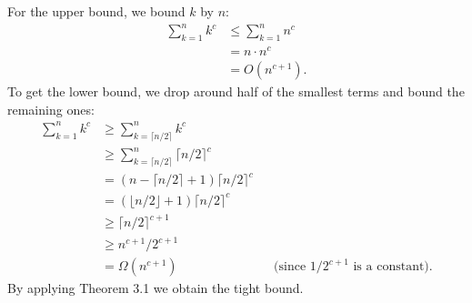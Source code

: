 \exercise
For the upper bound, we bound $k$ by $n$:
\begin{align*}
    \sum_{k=1}^n k^c &\le \sum_{k=1}^n n^c \\
    &= n\cdot n^c \\
    &= O(n^{c+1}).
\end{align*}
To get the lower bound, we drop around half of the smallest terms and bound the remaining ones:
\begin{align*}
    \sum_{k=1}^n k^c &\ge \sum_{k=\lceil n/2\rceil}^{n} k^c \\
    &\ge \sum_{k=\lceil n/2\rceil}^{n} \lceil n/2\rceil^c \\
    &= (n-\lceil n/2\rceil+1)\lceil n/2\rceil^c \\
    &= (\lfloor n/2\rfloor+1)\lceil n/2\rceil^c \\
    &\ge \lceil n/2\rceil^{c+1} \\
    &\ge n^{c+1}\!/2^{c+1} \\
    &= \Omega(n^{c+1}) && \text{(since $1/2^{c+1}$ is a constant)}.
\end{align*}
By applying Theorem 3.1 we obtain the tight bound.
